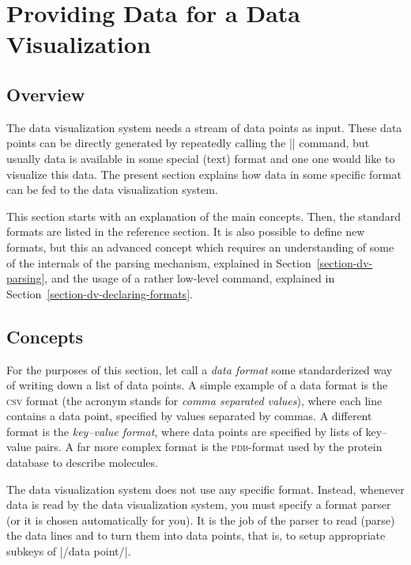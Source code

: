 %
%
%


\section{Providing Data for a Data Visualization}

\subsection{Overview}

The data visualization system needs a stream of data points as
input. These data points can be directly generated by repeatedly
calling the |\pgfdatapoint| command, but usually data is available in
some special (text) format and one one would like to visualize this
data. The present section explains how data in some specific format
can be fed to the data visualization system.

This section starts with an explanation of the main concepts. Then,
the standard formats are listed in the reference section. It is also
possible to define new formats, but this an advanced concept which
requires an understanding of some of the internals of the parsing mechanism,
explained in Section~\ref{section-dv-parsing}, and the usage of a
rather low-level command, explained in Section~\ref{section-dv-declaring-formats}.


\subsection{Concepts}

For the purposes of this section, let call a \emph{data format} some
standarderized way of writing down a list of data points. A simple
example of a data format is the \textsc{csv} format (the acronym
stands for \emph{comma separated values}), where each line contains a
data point, specified by values separated by commas. A different
format is the \emph{key--value format}, where data points are
specified by lists of key--value pairs. A far more complex format is
the \textsc{pdb}-format used by the protein database to describe
molecules.

The data visualization system does not use any specific
format. Instead, whenever data is read by the data visualization
system, you must specify a format parser (or it is chosen
automatically for you). It is the job of the parser to read (parse)
the data lines and to turn them into data points, that is, to setup
appropriate subkeys of |/data point/|.

